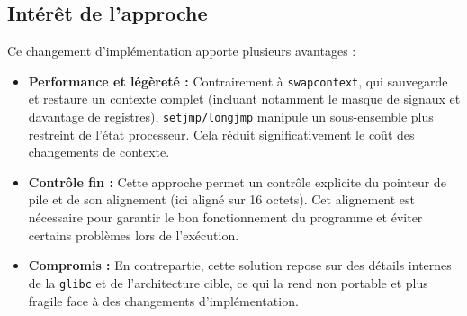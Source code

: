 \subsection{Intérêt de l'approche}

Ce changement d'implémentation apporte plusieurs avantages :

\begin{itemize}
    \item \textbf{Performance et légèreté :} Contrairement à
    \texttt{swapcontext}, qui sauvegarde et restaure un contexte complet
    (incluant notamment le masque de signaux et davantage de registres),
    \texttt{setjmp/longjmp} manipule un sous-ensemble plus restreint de
    l'état processeur. Cela réduit significativement le coût des changements
    de contexte.

    \item \textbf{Contrôle fin :} Cette approche permet un contrôle explicite
    du pointeur de pile et de son alignement (ici aligné sur 16 octets). Cet
    alignement est nécessaire pour garantir le bon fonctionnement du programme
    et éviter certains problèmes lors de l'exécution.

    \item \textbf{Compromis :} En contrepartie, cette solution repose sur des
    détails internes de la \texttt{glibc} et de l'architecture cible, ce qui
    la rend non portable et plus fragile face à des changements
    d'implémentation.
\end{itemize}
